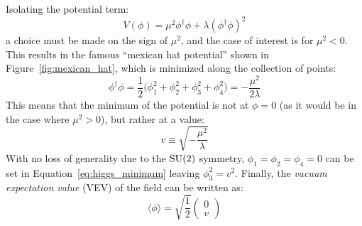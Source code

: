 Isolating the potential term:
\begin{equation}
  V(\phi) = \mu^2\phi^{\dagger}\phi+\lambda(\phi^{\dagger}\phi)^2
  \label{eq:higgs_potential}
\end{equation}
a choice must be made on the sign of $\mu^2$, and the case of interest is for $\mu^2 < 0$. %
This results in the famous ``mexican hat potential'' shown in Figure~\ref{fig:mexican_hat}, which is minimized along the collection of points:
\begin{equation}
  \phi^{\dagger}\phi = \frac{1}{2}\big(\phi_1^2 + \phi_2^2 + \phi_3^2 + \phi_4^2\big) = -\frac{\mu^2}{2\lambda}
  \label{eq:higgs_minimum}
\end{equation}
This means that the minimum of the potential is not at $\phi = 0$ (as it would be in the case where $\mu^2 > 0$), but rather at a value:
\begin{equation}
  v \equiv \sqrt{-\frac{\mu^2}{\lambda}}
  \label{eq:higgs_minimum}
\end{equation}
With no loss of generality due to the $\textrm{SU}(2)$ symmetry, $\phi_1 = \phi_2 = \phi_4 = 0$ can be set in Equation~\ref{eq:higgs_minimum} leaving $\phi_3^2 = v^2$.
Finally, the \emph{vacuum expectation value} (VEV) of the field can be written as:
\begin{equation}
  \langle\phi\rangle = \sqrt{\frac{1}{2}}
  \begin{pmatrix}
  0 \\ v
  \end{pmatrix}
  \label{eq:vev}
\end{equation}

